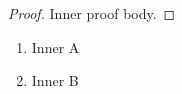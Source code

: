 \begin{proof}
Inner proof body.
\end{proof}
\begin{enumerate}[label=(\alph*)]
\item Inner A
\item Inner B
\end{enumerate}
